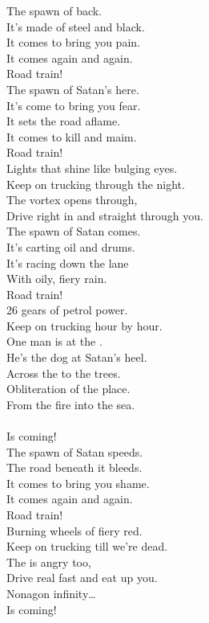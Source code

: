
The spawn of  back. \\
It's made of steel and black. \\
It comes to bring you pain. \\
It comes again and again. \\
Road train! \\

The spawn of Satan's here. \\
It's come to bring you fear. \\
It sets the road aflame. \\
It comes to kill and maim. \\
Road train! \\

Lights that shine like bulging eyes. \\
Keep on trucking through the night. \\
The vortex opens through, \\
Drive right in and straight through you. \\

The spawn of Satan comes. \\
It's carting oil and drums. \\
It's racing down the lane \\
With oily, fiery rain. \\
Road train! \\

26 gears of petrol power. \\
Keep on trucking hour by hour. \\
One man is at the . \\
He's the dog at Satan's heel. \\

Across the  to the trees. \\
Obliteration of the place. \\
From the fire into the sea. \\
 \\
Is coming! \\

The spawn of Satan speeds. \\
The road beneath it bleeds. \\
It comes to bring you shame. \\
It comes again and again. \\
Road train! \\

Burning wheels of fiery red. \\
Keep on trucking till we're dead. \\
The  is angry too, \\
Drive real fast and eat up you. \\

Nonagon infinity… \\
Is coming! \\
